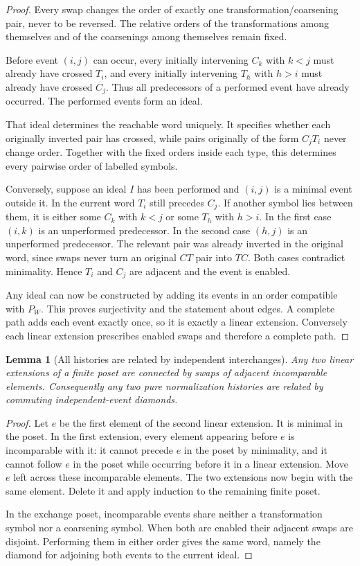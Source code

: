 \documentclass[11pt]{article}
\newtheorem{lemma}[theorem]{Lemma}
\theoremstyle{definition}
\theoremstyle{remark}
\begin{document}
\begin{proof}
Every swap changes the order of exactly one transformation/coarsening pair, never to be reversed. The relative orders of the transformations among themselves and of the coarsenings among themselves remain fixed.

Before event $(i,j)$ can occur, every initially intervening $C_k$ with $k<j$ must already have crossed $T_i$, and every initially intervening $T_h$ with $h>i$ must already have crossed $C_j$. Thus all predecessors of a performed event have already occurred. The performed events form an ideal.

That ideal determines the reachable word uniquely. It specifies whether each originally inverted pair has crossed, while pairs originally of the form $C_jT_i$ never change order. Together with the fixed orders inside each type, this determines every pairwise order of labelled symbols.

Conversely, suppose an ideal $I$ has been performed and $(i,j)$ is a minimal event outside it. In the current word $T_i$ still precedes $C_j$. If another symbol lies between them, it is either some $C_k$ with $k<j$ or some $T_h$ with $h>i$. In the first case $(i,k)$ is an unperformed predecessor. In the second case $(h,j)$ is an unperformed predecessor. The relevant pair was already inverted in the original word, since swaps never turn an original $CT$ pair into $TC$. Both cases contradict minimality. Hence $T_i$ and $C_j$ are adjacent and the event is enabled.

Any ideal can now be constructed by adding its events in an order compatible with $P_W$. This proves surjectivity and the statement about edges. A complete path adds each event exactly once, so it is exactly a linear extension. Conversely each linear extension prescribes enabled swaps and therefore a complete path.
\end{proof}

\begin{lemma}[All histories are related by independent interchanges]\label{lem:linear-extension-swaps}
Any two linear extensions of a finite poset are connected by swaps of adjacent incomparable elements. Consequently any two pure normalization histories are related by commuting independent-event diamonds.
\end{lemma}

\begin{proof}
Let $e$ be the first element of the second linear extension. It is minimal in the poset. In the first extension, every element appearing before $e$ is incomparable with it: it cannot precede $e$ in the poset by minimality, and it cannot follow $e$ in the poset while occurring before it in a linear extension. Move $e$ left across these incomparable elements. The two extensions now begin with the same element. Delete it and apply induction to the remaining finite poset.

In the exchange poset, incomparable events share neither a transformation symbol nor a coarsening symbol. When both are enabled their adjacent swaps are disjoint. Performing them in either order gives the same word, namely the diamond for adjoining both events to the current ideal.
\end{proof}
\end{document}
